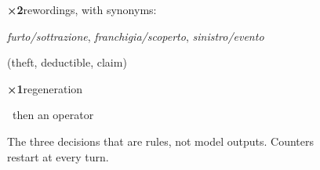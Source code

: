 \begin{figure}[H]
\begin{tcbraster}[raster columns=3, cardgrid, raster before skip=0pt]
\begin{tcolorbox}[card]
      {\color{accent}\Large\bfseries ×2}\enspace rewordings, with synonyms:\par
      \textit{furto/sottrazione}, \textit{franchigia/scoperto}, \textit{sinistro/evento}\par
      {\color{black!55}(theft, deductible, claim)}\par
      {\color{accent}\Large\bfseries ×1}\enspace regeneration\par
      {\color{bad}\faHeadset}\ then an operator
    \end{tcolorbox}
  \end{tcbraster}
  \caption{The three decisions that are rules, not model outputs. Counters restart at every
    turn.}
  \label{fig:routing-rules}
\end{figure}
